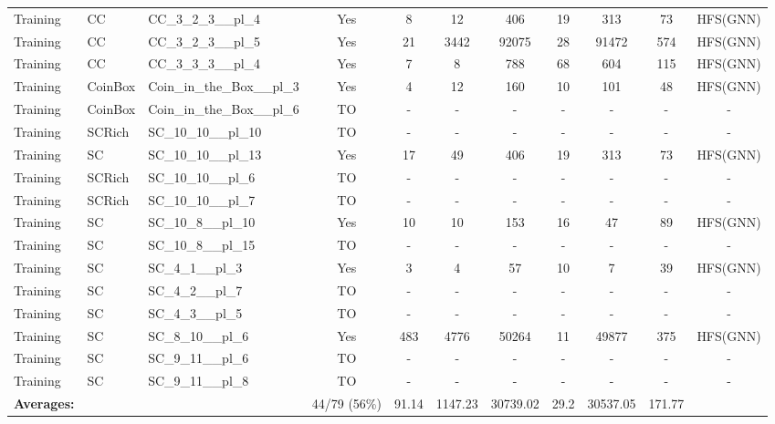 \documentclass{article}
\begin{document}
\begin{tabular}{lllcccccccc}
Training & CC & CC\_3\_2\_3\_\_pl\_4 & Yes & 8 & 12 & 406 & 19 & 313 & 73 & HFS(GNN) \\
Training & CC & CC\_3\_2\_3\_\_pl\_5 & Yes & 21 & 3442 & 92075 & 28 & 91472 & 574 & HFS(GNN) \\
Training & CC & CC\_3\_3\_3\_\_pl\_4 & Yes & 7 & 8 & 788 & 68 & 604 & 115 & HFS(GNN) \\
Training & CoinBox & Coin\_in\_the\_Box\_\_pl\_3 & Yes & 4 & 12 & 160 & 10 & 101 & 48 & HFS(GNN) \\
Training & CoinBox & Coin\_in\_the\_Box\_\_pl\_6 & TO & - & - & - & - & - & - & - \\
Training & SCRich & SC\_10\_10\_\_pl\_10 & TO & - & - & - & - & - & - & - \\
Training & SC & SC\_10\_10\_\_pl\_13 & Yes & 17 & 49 & 406 & 19 & 313 & 73 & HFS(GNN) \\
Training & SCRich & SC\_10\_10\_\_pl\_6 & TO & - & - & - & - & - & - & - \\
Training & SCRich & SC\_10\_10\_\_pl\_7 & TO & - & - & - & - & - & - & - \\
Training & SC & SC\_10\_8\_\_pl\_10 & Yes & 10 & 10 & 153 & 16 & 47 & 89 & HFS(GNN) \\
Training & SC & SC\_10\_8\_\_pl\_15 & TO & - & - & - & - & - & - & - \\
Training & SC & SC\_4\_1\_\_pl\_3 & Yes & 3 & 4 & 57 & 10 & 7 & 39 & HFS(GNN) \\
Training & SC & SC\_4\_2\_\_pl\_7 & TO & - & - & - & - & - & - & - \\
Training & SC & SC\_4\_3\_\_pl\_5 & TO & - & - & - & - & - & - & - \\
Training & SC & SC\_8\_10\_\_pl\_6 & Yes & 483 & 4776 & 50264 & 11 & 49877 & 375 & HFS(GNN) \\
Training & SC & SC\_9\_11\_\_pl\_6 & TO & - & - & - & - & - & - & - \\
Training & SC & SC\_9\_11\_\_pl\_8 & TO & - & - & - & - & - & - & - \\
\textbf{Averages:} & & & 44/79 (56\%) & 91.14 & 1147.23 & 30739.02 & 29.2 & 30537.05 & 171.77 & \\
\bottomrule
\end{tabular}
\newpage
\end{document}
